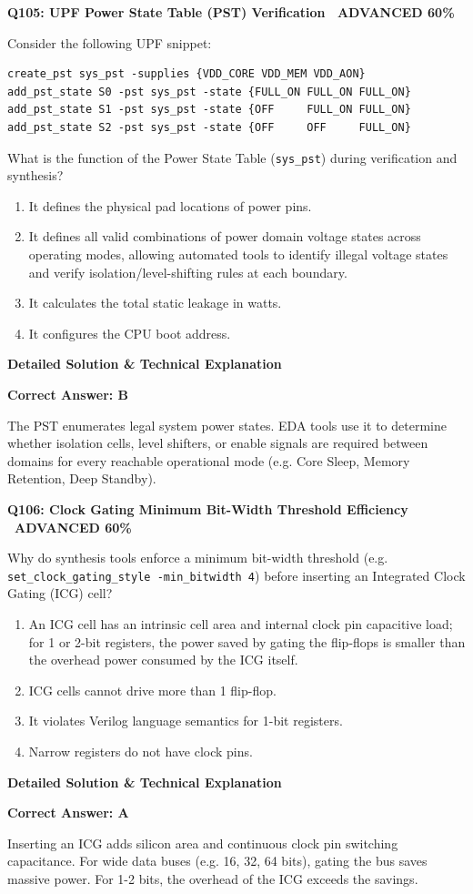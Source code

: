 \documentclass[11pt,a4paper]{article}
\newcommand{\badgeadv}{{\color{white}\colorbox{advred}{\bfseries\sffamily\tiny\ ADVANCED 60\%\ }}}
\newenvironment{qbox}[2]{%
  \begin{mdframed}[style=qstyle]%
  {\bfseries\sffamily\color{primaryblue}#1 \hfill #2}\par\vspace{2pt}%
}{%
  \end{mdframed}%
}
\newenvironment{ansbox}{%
  \begin{mdframed}[style=ansstyle]%
  {\bfseries\sffamily\color{ansgreen}\small Detailed Solution \& Technical Explanation}\par\vspace{2pt}\small%
}{%
  \end{mdframed}%
}
\begin{document}
\begin{qbox}{Q105: UPF Power State Table (PST) Verification}{\badgeadv}
Consider the following UPF snippet:
\begin{lstlisting}[style=tclstyle]
create_pst sys_pst -supplies {VDD_CORE VDD_MEM VDD_AON}
add_pst_state S0 -pst sys_pst -state {FULL_ON FULL_ON FULL_ON}
add_pst_state S1 -pst sys_pst -state {OFF     FULL_ON FULL_ON}
add_pst_state S2 -pst sys_pst -state {OFF     OFF     FULL_ON}
\end{lstlisting}
What is the function of the Power State Table (\texttt{sys\_pst}) during verification and synthesis?
\begin{enumerate}[label=\textbf{\Alph*.}]
  \item It defines the physical pad locations of power pins.
  \item It defines all valid combinations of power domain voltage states across operating modes, allowing automated tools to identify illegal voltage states and verify isolation/level-shifting rules at each boundary.
  \item It calculates the total static leakage in watts.
  \item It configures the CPU boot address.
\end{enumerate}
\end{qbox}
\begin{ansbox}
\textbf{Correct Answer: B}

The PST enumerates legal system power states. EDA tools use it to determine whether isolation cells, level shifters, or enable signals are required between domains for every reachable operational mode (e.g. Core Sleep, Memory Retention, Deep Standby).
\end{ansbox}

\begin{qbox}{Q106: Clock Gating Minimum Bit-Width Threshold Efficiency}{\badgeadv}
Why do synthesis tools enforce a minimum bit-width threshold (e.g. \texttt{set\_clock\_gating\_style -min\_bitwidth 4}) before inserting an Integrated Clock Gating (ICG) cell?
\begin{enumerate}[label=\textbf{\Alph*.}]
  \item An ICG cell has an intrinsic cell area and internal clock pin capacitive load; for 1 or 2-bit registers, the power saved by gating the flip-flops is smaller than the overhead power consumed by the ICG itself.
  \item ICG cells cannot drive more than 1 flip-flop.
  \item It violates Verilog language semantics for 1-bit registers.
  \item Narrow registers do not have clock pins.
\end{enumerate}
\end{qbox}
\begin{ansbox}
\textbf{Correct Answer: A}

Inserting an ICG adds silicon area and continuous clock pin switching capacitance. For wide data buses (e.g. 16, 32, 64 bits), gating the bus saves massive power. For 1-2 bits, the overhead of the ICG exceeds the savings.
\end{ansbox}
\end{document}
